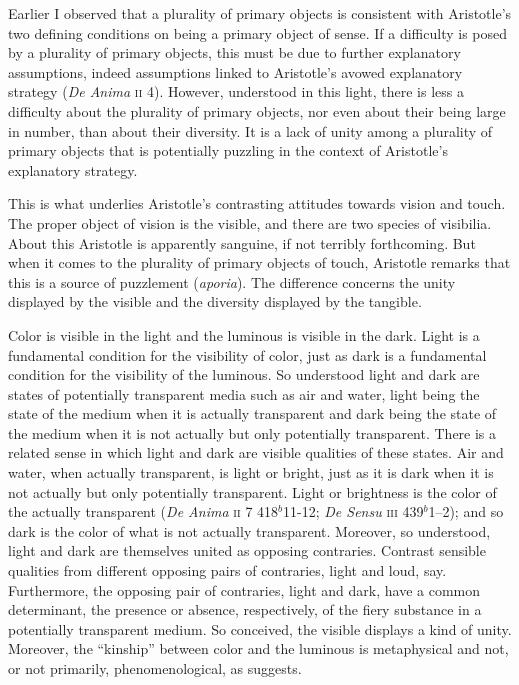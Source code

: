 Earlier I observed that a plurality of primary objects is consistent with Aristotle's two defining conditions on being a primary object of sense. If a difficulty is posed by a plurality of primary objects, this must be due to further explanatory assumptions, indeed assumptions linked to Aristotle's avowed explanatory strategy (\emph{De Anima} \textsc{ii} 4). However, understood in this light, there is less a difficulty about the plurality of primary objects, nor even about their being large in number, than about their diversity. It is a lack of unity among a plurality of primary objects that is potentially puzzling in the context of Aristotle's explanatory strategy. 

This is what underlies Aristotle's contrasting attitudes towards vision and touch. The proper object of vision is the visible, and there are two species of visibilia. About this Aristotle is apparently sanguine, if not terribly forthcoming. But when it comes to the plurality of primary objects of touch, Aristotle remarks that this is a source of puzzlement (\emph{aporia}). The difference concerns the unity displayed by the visible and the diversity displayed by the tangible. 

Color is visible in the light and the luminous is visible in the dark. Light is a fundamental condition for the visibility of color, just as dark is a fundamental condition for the visibility of the luminous. So understood light and dark are states of potentially transparent media such as air and water, light being the state of the medium when it is actually transparent and dark being the state of the medium when it is not actually but only potentially transparent. There is a related sense in which light and dark are visible qualities of these states. Air and water, when actually transparent, is light or bright, just as it is dark when it is not actually but only potentially transparent. Light or brightness is the color of the actually transparent (\emph{De Anima} \textsc{ii} 7 418\( ^{b} \)11-12; \emph{De Sensu} \textsc{iii} 439\( ^{b} \)1--2); and so dark is the color of what is not actually transparent. Moreover, so understood, light and dark are themselves united as opposing contraries. Contrast sensible qualities from different opposing pairs of contraries, light and loud, say. Furthermore, the opposing pair of contraries, light and dark, have a common determinant, the presence or absence, respectively, of the fiery substance in a potentially transparent medium. So conceived, the visible displays a kind of unity. Moreover, the ``kinship'' between color and the luminous is metaphysical and not, or not primarily, phenomenological, as \citet[63]{Sorabji:1971fr} suggests.

